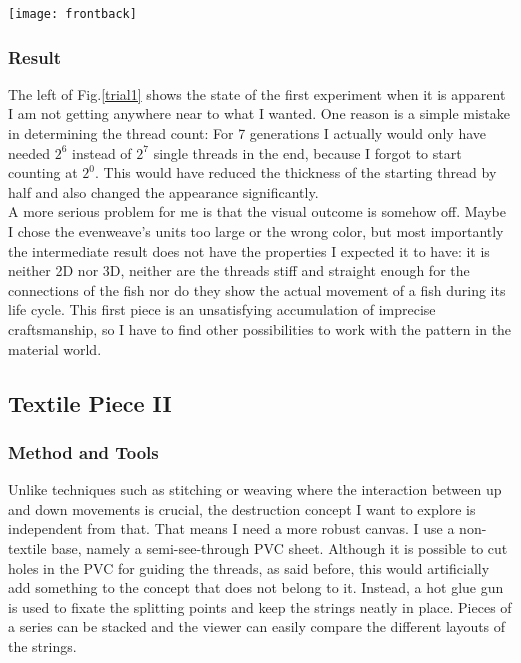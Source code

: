 \documentclass{scrartcl}
\begin{document}
\begin{minipage}[t]{\textwidth}
    \texttt{[image: frontback]}
	\label{trial1}
\end{minipage}
\vspace{0.5cm}

\subsubsection{Result}
The left of Fig.\ref{trial1} shows the state of the first experiment when it is apparent I am not getting anywhere near to what I wanted. One reason is a simple mistake in determining the thread count: For 7 generations I actually would only have needed $2^6$ instead of $2^7$ single threads in the end, because I forgot to start counting at $2^0$. This would have reduced the thickness of the starting thread by half and also changed the appearance significantly.\\
A more serious problem for me is that the visual outcome is somehow off. Maybe I chose the evenweave's units too large or the wrong color, but most importantly the intermediate result does not have the properties I expected it to have: it is neither 2D nor 3D, neither are the threads stiff and straight enough for the connections of the fish nor do they show the actual movement of a fish during its life cycle.
This first piece is an unsatisfying accumulation of imprecise craftsmanship, so I have to find other possibilities to work with the pattern in the material world.

\subsection{Textile Piece II}
\subsubsection{Method and Tools}
Unlike techniques such as stitching or weaving where the interaction between up and down movements is crucial, the destruction concept I want to explore is independent from that. That means I need a more robust canvas. I use a non-textile base, namely a semi-see-through PVC sheet. Although it is possible to cut holes in the PVC for guiding the threads, as said before, this would artificially add something to the concept that does not belong to it. Instead, a hot glue gun is used to fixate the splitting points and keep the strings neatly in place.
Pieces of a series can be stacked and the viewer can easily compare the different layouts of the strings.
\end{document}
